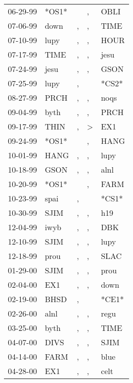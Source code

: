 \begin{supertabular}{lllll}
 06-29-99 &  *OS1* &               &             , &   OBLI \\
 07-06-99 &   down &             , &             , &   TIME \\
 07-10-99 &   lupy &             , &             , &   HOUR \\
 07-17-99 &   TIME &             , &             , &   jesu \\
 07-24-99 &   jesu &             , &             , &   GSON \\
 07-25-99 &   lupy &             , &               &  *CS2* \\
 08-27-99 &   PRCH &             , &             , &   noqs \\
 09-04-99 &   byth &             , &             , &   PRCH \\
 09-17-99 &   THIN &             , &  \textgreater &    EX1 \\
 09-24-99 &  *OS1* &               &             , &   HANG \\
 10-01-99 &   HANG &             , &             , &   lupy \\
 10-18-99 &   GSON &             , &             , &   alnl \\
 10-20-99 &  *OS1* &               &             , &   FARM \\
 10-23-99 &   spai &             , &               &  *CS1* \\
 10-30-99 &   SJIM &             , &             , &    h19 \\
 12-04-99 &   iwyb &             , &             , &    DBK \\
 12-10-99 &   SJIM &             , &             , &   lupy \\
 12-18-99 &   prou &             , &             , &   SLAC \\
 01-29-00 &   SJIM &             , &             , &   prou \\
 02-04-00 &    EX1 &             , &             , &   down \\
 02-19-00 &   BHSD &             , &               &  *CE1* \\
 02-26-00 &   alnl &             , &             , &   regu \\
 03-25-00 &   byth &             , &             , &   TIME \\
 04-07-00 &   DIVS &             , &             , &   SJIM \\
 04-14-00 &   FARM &             , &             , &   blue \\
 04-28-00 &    EX1 &             , &             , &   celt \\

\end{supertabular}
